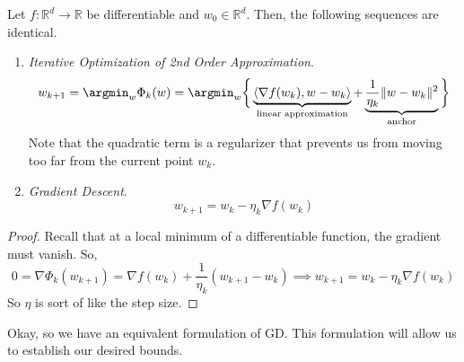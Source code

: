 	\begin{lemma}
		Let $f: \mathbb{R}^d \to \mathbb{R}$ be differentiable and $w_0 \in \mathbb{R}^d$. Then, the following sequences are identical. 
		\begin{enumerate}
		  \item \textit{Iterative Optimization of 2nd Order Approximation}. 
				\begin{equation}
					w_{k+1} = \argmin_w \Phi_k (w) = \argmin_w \bigg\{ \underbrace{\langle \nabla f(w_k), w - w_k \rangle}_{\text{linear approximation}} + \underbrace{\frac{1}{\eta_k} \|w - w_k\|^2}_{\text{anchor}} \bigg\}
				\end{equation}
				Note that the quadratic term is a regularizer that prevents us from moving too far from the current point $w_k$. 

			\item \textit{Gradient Descent}. 
				\begin{equation}
					w_{k+1} = w_k - \eta_k \nabla f(w_k)
				\end{equation}
		\end{enumerate}
	\end{lemma}
	\begin{proof}
		Recall that at a local minimum of a differentiable function, the gradient must vanish. So, 
		\begin{equation}
			0 = \nabla \Phi_k (w_{k+1}) = \nabla f(w_k) + \frac{1}{\eta_k}(w_{k+1} - w_k) \implies w_{k+1} = w_k - \eta_k \nabla f(w_k)
		\end{equation}
		So $\eta$ is sort of like the step size. 
	\end{proof}

	Okay, so we have an equivalent formulation of GD. This formulation will allow us to establish our desired bounds. 

